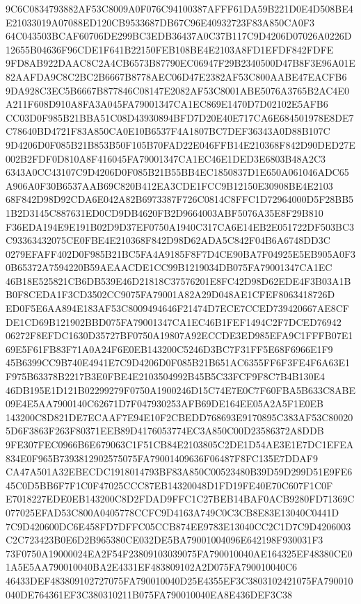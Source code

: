 \documentclass[UTF8,fontset=fandol,zihao=-4,a4paper]{ctexart}
\begin{document}
{{9C6C0834793882AF53C8009A0F076C94100387AFFF61DA59B221D0E4D508BE4E21033019A07088ED120CB9533687DB67C96E40932723F83A850CA0F3
64C043503BCAF60706DE299BC3EDB36437A0C37B117C9D4206D07026A0226D12655B04636F96CDE1F641B22150FEB108BE4E2103A8FD1EFDF842FDFE
9FD8AB922DAAC8C2A4CB6573B87790EC06947F29B2340500D47B8F3E96A01E82AAFDA9C8C2BC2B6667B8778AEC06D47E2382AF53C800AABE47EACFB6
9DA928C3EC5B6667B877846C08147E2082AF53C8001ABE5076A3765B2AC4E0A211F608D910A8FA3A045FA79001347CA1EC869E1470D7D02102E5AFB6
CC03D0F985B21BBA51C08D43930894BFD7D20E40E717CA6E684501978E8DE7C78640BD4721F83A850CA0E10B6537F4A1807BC7DEF36343A0D88B107C
9D4206D0F085B21B853B50F105B70FAD22E046FFB14E210368F842D90DED27E002B2FDF0D810A8F416045FA79001347CA1EC46E1DED3E6803B48A2C3
6343A0CC43107C9D4206D0F085B21B55BB4EC1850837D1E650A061046ADC65A906A0F30B6537AAB69C820B412EA3CDE1FCC9B12150E30908BE4E2103
68F842D98D92CDA6E042A82B6973387F726C0814C8FFC1D72964000D5F28BB51B2D3145C887631ED0CD9DB4620FB2D9664003ABF5076A35E8F29B810
F36EDA194E9E191B02D9D37EF0750A1940C317CA6E14EB2E051722DF503BC3C93363432075CE0FBE4E210368F842D98D62ADA5C842F04B6A6748DD3C
0279EFAFF402D0F985B21BC5FA4A9185F8F7D4CE90BA7F04925E5EB905A0F30B65372A7594220B59AEAACDE1CC99B1219034DB075FA79001347CA1EC
46B18E525821CB6DB539E46D21818C37576201E8FC42D98D62EDE4F3B03A1BB0F8CEDA1F3CD3502CC9075FA79001A82A29D048AE1CFEF8063418726D
ED0F5E6AA894E183AF53C8009494646F21474D7ECE7CCED739420667AE8CFDE1CD69B121902BBD075FA79001347CA1EC46B1FEF1494C2F7DCED76942
06272F8EFDC1630D35727BF0750A19807A92ECCDE3ED985EFA9C1FFFB07E169E5F61FB83F71A0A24F6E0EB143200C5246D3BC7F31FF5E68F6966E1F9
45B6399CC9B740E4941E7C9D4206D0F085B21B651AC6355FF6F3FE4F6A63E1F975B63378B2217B3E0FBE4E2103504992B45B5C33FCF9F8C7B4B130E4
46DB195E1D121B02299279F0750A1900246D15C74E7E0C7F60FBA5B633C8ABE09E4E5AA7900140C62671D7F047930253AFB69DE164EE05A2A5F1E0EB
143200C8D821DE7ECAAF7E94E10F2CBEDD768693E9170895C383AF53C800205D6F3863F263F80371EEB89D4176053774EC3A850C00D23586372A8DDB
9FE307FEC0966B6E679063C1F51CB84E2103805C2DE1D54AE3E1E7DC1EFEA834E0F965B7393812902575075FA79001409636F06487F8FC135E7DDAF9
CA47A501A32EBECDC1918014793BF83A850C00523480B39D59D299D51E9FE645C0D5BB6F7F1C0F47025CCC87EB14320048D1FD19FE40E70C607F1C0F
E7018227EDE0EB143200C8D2FDAD9FFC1C27BEB14BAF0ACB9280FD71369C077025EFAD53C800A0405778CCFC9D4163A749C0C3CB8E83E13040C0441D
7C9D420600DC6E458FD7DFFC05CCB874EE9783E13040CC2C1D7C9D4206003C2C723423B0E6D2B965380CE032DE5BA79001004096E642198F930031F3
73F0750A19000024EA2F54F23809103039075FA790010040AE164325EF48380CE01A5E5AA790010040BA2E4331EF483809102A2D075FA790010040C6
46433DEF483809102727075FA790010040D25E4355EF3C3803102421075FA790010040DE764361EF3C380310211B075FA790010040EA8E436DEF3C38
}}
\end{document}
